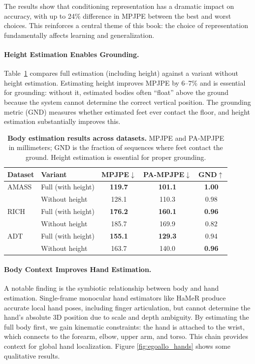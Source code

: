 The results show that conditioning representation has a dramatic
impact on accuracy, with up to 24\% difference in MPJPE between the
best and worst choices. This reinforces a central theme of this book:
the choice of representation fundamentally affects learning and generalization.

\paragraph{Height Estimation Enables Grounding.}
Table~\ref{tab:egoallo_body_results} compares full estimation
(including height) against a variant without height estimation.
Estimating height improves MPJPE by 6--7\% and is essential for
grounding: without it, estimated bodies often ``float'' above the
ground because the system cannot determine the correct vertical
position. The grounding metric (GND) measures whether estimated feet
ever contact the floor, and height estimation substantially improves this.

\begin{table}[t]
    \centering
    \caption{\textbf{Body estimation results across datasets.} MPJPE
        and PA-MPJPE in millimeters; GND is the fraction of sequences
        where feet contact the ground. Height estimation is essential for
    proper grounding.}
    \label{tab:egoallo_body_results}
    \small
    \begin{tabular}{llccc}
        \toprule
        \textbf{Dataset} & \textbf{Variant} &
        \textbf{MPJPE}$\downarrow$ & \textbf{PA-MPJPE}$\downarrow$ &
        \textbf{GND}$\uparrow$ \\
        \midrule
        AMASS & Full (with height) & \textbf{119.7} & \textbf{101.1}
        & \textbf{1.00} \\
        & Without height & 128.1 & 110.3 & 0.98 \\
        \midrule
        RICH  & Full (with height) & \textbf{176.2} & \textbf{160.1}
        & \textbf{0.96} \\
        & Without height & 185.7 & 169.9 & 0.82 \\
        \midrule
        ADT   & Full (with height) & \textbf{155.1} & \textbf{129.3} & 0.94 \\
        & Without height & 163.7 & 140.0 & \textbf{0.96} \\
        \bottomrule
    \end{tabular}
\end{table}

\paragraph{Body Context Improves Hand Estimation.}
A notable finding is the symbiotic relationship between body and hand
estimation. Single-frame monocular hand estimators like HaMeR produce
accurate local hand poses, including finger articulation, but cannot
determine the hand's absolute 3D position due to scale and depth
ambiguity. By estimating the full body first, we gain kinematic
constraints: the hand is attached to the wrist, which connects to the
forearm, elbow, upper arm, and torso. This chain provides context for
global hand localization. Figure \ref{fig:egoallo_hands} shows some
qualitative results.


